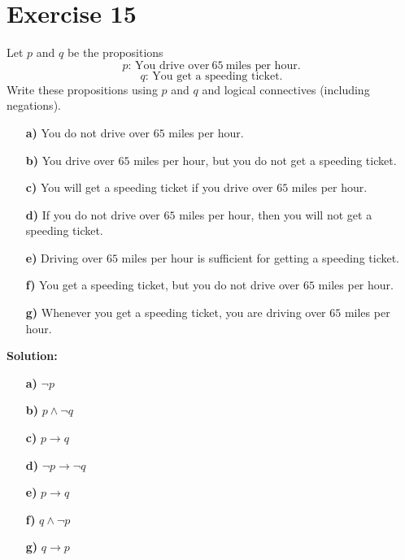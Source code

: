 \documentclass{Axon}
\begin{document}
\section*{Exercise 15}
Let \(p\) and \(q\) be the propositions
\begin{equation}
    p\text{: You drive over} \ 65 \ \text{miles per hour.}
\end{equation}
\begin{equation}
    q\text{: You get a speeding ticket.}
\end{equation}
Write these propositions using \(p\) and \(q\) and logical connectives (including negations).
\begin{enumerate}
    \item[\textbf{a)}] You do not drive over \(65\) miles per hour.
    \item[\textbf{b)}] You drive over \(65\) miles per hour, but you do not get a speeding ticket.
    \item[\textbf{c)}] You will get a speeding ticket if you drive over \(65\) miles per hour.
    \item[\textbf{d)}] If you do not drive over \(65\) miles per hour, then you will not get a speeding ticket.
    \item[\textbf{e)}] Driving over \(65\) miles per hour is sufficient for getting a speeding ticket.
    \item[\textbf{f)}] You get a speeding ticket, but you do not drive over \(65\) miles per hour.
    \item[\textbf{g)}] Whenever you get a speeding ticket, you are driving over \(65\) miles per hour.
\end{enumerate}

\noindent
\textbf{Solution:}
\begin{enumerate}
    \item[\textbf{a)}] \(\lnot p\)
    \item[\textbf{b)}] \(p \land \lnot q\)
    \item[\textbf{c)}] \(p \to q\)
    \item[\textbf{d)}] \(\lnot p \to \lnot q\)
    \item[\textbf{e)}] \(p \to q\)
    \item[\textbf{f)}] \(q \land \lnot p\)
    \item[\textbf{g)}] \(q \to p\)
\end{enumerate}
\end{document}
